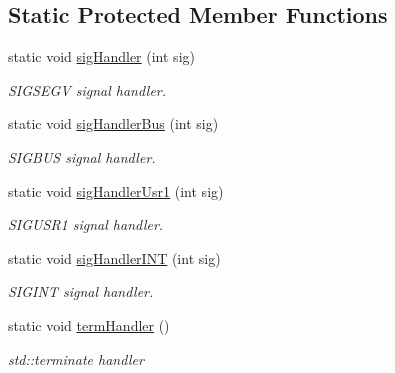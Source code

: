 \subsection*{Static Protected Member Functions}
\begin{DoxyCompactItemize}
\item 
static void \hyperlink{structvt_1_1runtime_1_1_runtime_a15fd3d8eb4952deca7488ff4fa07258c}{sig\+Handler} (int sig)
\begin{DoxyCompactList}\small\item\em S\+I\+G\+S\+E\+GV signal handler. \end{DoxyCompactList}\item 
static void \hyperlink{structvt_1_1runtime_1_1_runtime_aa94c1638280b8f5e9acac0fb44f85a6f}{sig\+Handler\+Bus} (int sig)
\begin{DoxyCompactList}\small\item\em S\+I\+G\+B\+US signal handler. \end{DoxyCompactList}\item 
static void \hyperlink{structvt_1_1runtime_1_1_runtime_a833f09083e671080fb8ae1a44bc50321}{sig\+Handler\+Usr1} (int sig)
\begin{DoxyCompactList}\small\item\em S\+I\+G\+U\+S\+R1 signal handler. \end{DoxyCompactList}\item 
static void \hyperlink{structvt_1_1runtime_1_1_runtime_a3ce54aa1371a6448670e06049a0985c4}{sig\+Handler\+I\+NT} (int sig)
\begin{DoxyCompactList}\small\item\em S\+I\+G\+I\+NT signal handler. \end{DoxyCompactList}\item 
static void \hyperlink{structvt_1_1runtime_1_1_runtime_abe295b9ea216fafe2b494e2bc609f8fb}{term\+Handler} ()
\begin{DoxyCompactList}\small\item\em std\+::terminate handler \end{DoxyCompactList}\end{DoxyCompactItemize}
